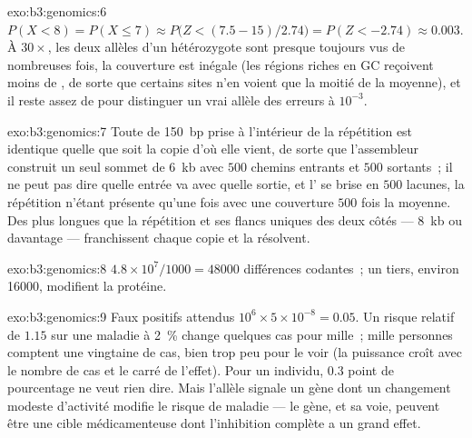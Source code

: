 \begin{solution}{exo:b3:genomics:6}
$P(X < 8) = P(X \le 7) \approx P\bigl(Z < (7.5 - 15)/2.74\bigr) =
P(Z < -2.74) \approx 0.003$. À $30\times$, les deux allèles d'un
hétérozygote sont presque toujours vus de nombreuses fois, la couverture
est inégale (les régions riches en GC reçoivent moins de , de
sorte que certains sites n'en voient que la moitié de la moyenne), et il
reste assez de  pour distinguer un vrai allèle des erreurs à
$10^{-3}$.
\end{solution}

\begin{solution}{exo:b3:genomics:7}
Toute  de \qty{150}{bp} prise à l'intérieur de la répétition est
identique quelle que soit la copie d'où elle vient, de sorte que
l'assembleur construit un seul sommet de \qty{6}{kb} avec $500$ chemins
entrants et $500$ sortants~; il ne peut pas dire quelle entrée va avec
quelle sortie, et l' se brise en $500$ lacunes, la répétition
n'étant présente qu'une fois avec une couverture $500$ fois la moyenne.
Des  plus longues que la répétition et ses flancs uniques des
deux côtés --- \qty{8}{kb} ou davantage --- franchissent chaque copie et
la résolvent.
\end{solution}

\begin{solution}{exo:b3:genomics:8}
$4.8\times 10^{7}/1000 = \num{48000}$ différences codantes~; un tiers,
environ \num{16000}, modifient la protéine.
\end{solution}

\begin{solution}{exo:b3:genomics:9}
Faux positifs attendus $10^{6}\times 5\times 10^{-8} = 0.05$. Un risque
relatif de $1.15$ sur une maladie à \qty{2}{\%} change quelques cas pour
mille~; mille personnes comptent une vingtaine de cas, bien trop peu
pour le voir (la puissance croît avec le nombre de cas et le carré de
l'effet). Pour un individu, $0.3$ point de pourcentage ne veut rien
dire. Mais l'allèle signale un gène dont un changement modeste
d'activité modifie le risque de maladie --- le gène, et sa voie, peuvent
être une cible médicamenteuse dont l'inhibition complète a un grand
effet.
\end{solution}

